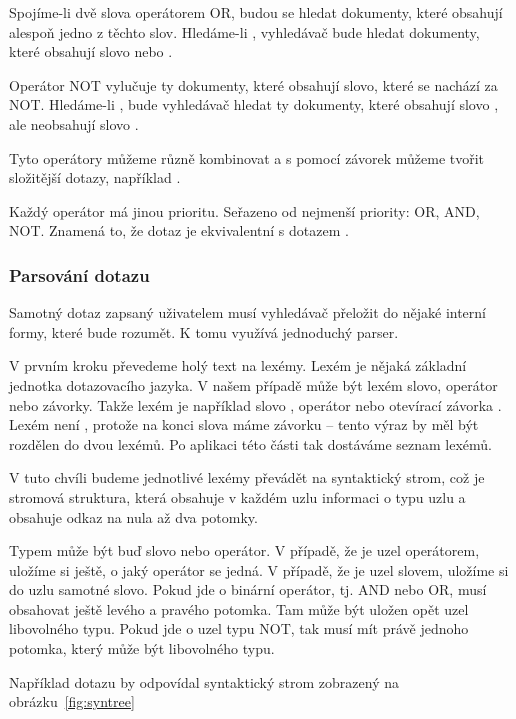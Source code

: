 \documentclass[12pt]{article}
\newcommand{\sssection}[1]{\subsubsection{#1}}
\begin{document}
Spojíme-li dvě slova operátorem OR, budou se hledat dokumenty, které obsahují alespoň jedno z těchto slov. Hledáme-li , vyhledávač bude hledat dokumenty, které obsahují slovo  nebo .

Operátor NOT vylučuje ty dokumenty, které obsahují slovo, které se nachází za NOT. Hledáme-li , bude vyhledávač hledat ty dokumenty, které obsahují slovo , ale neobsahují slovo . 

Tyto operátory můžeme různě kombinovat a s pomocí závorek můžeme tvořit složitější dotazy, například . 

Každý operátor má jinou prioritu. Seřazeno od nejmenší priority: OR, AND, NOT. Znamená to, že dotaz  je ekvivalentní s dotazem .

\sssection{Parsování dotazu}

Samotný dotaz zapsaný uživatelem musí vyhledávač přeložit do nějaké interní formy, které bude rozumět. K tomu využívá jednoduchý parser. 

V prvním kroku převedeme holý text na lexémy. Lexém je nějaká základní jednotka dotazovacího jazyka. V našem případě může být lexém slovo, operátor nebo závorky. Takže lexém je například slovo , operátor  nebo otevírací závorka \uv{(}. Lexém není , protože na konci slova máme závorku -- tento výraz by měl být rozdělen do dvou lexémů. Po aplikaci této části tak dostáváme seznam lexémů. 

V tuto chvíli budeme jednotlivé lexémy převádět na syntaktický strom, což je stromová struktura, která obsahuje v každém uzlu informaci o typu uzlu a obsahuje odkaz na nula až dva potomky. 

Typem může být buď slovo nebo operátor. V případě, že je uzel operátorem, uložíme si ještě, o jaký operátor se jedná. V případě, že je uzel slovem, uložíme si do uzlu samotné slovo. Pokud jde o binární operátor, tj. AND nebo OR, musí obsahovat ještě levého a pravého potomka. Tam může být uložen opět uzel libovolného typu. Pokud jde o uzel typu NOT, tak musí mít právě jednoho potomka, který může být libovolného typu. 

Například dotazu  by odpovídal syntaktický strom zobrazený na obrázku~\ref{fig:syntree}
\end{document}

